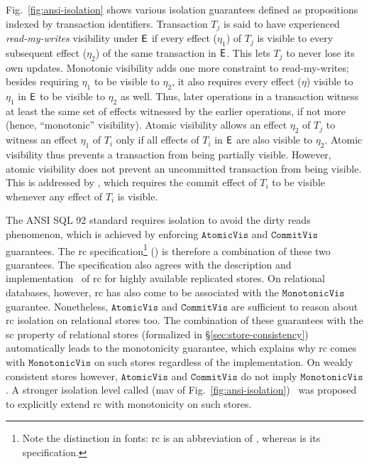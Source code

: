 Fig.~\ref{fig:ansi-isolation} shows various isolation guarantees
defined as propositions indexed by transaction identifiers.
Transaction $T_j$ is said to have experienced \emph{read-my-writes}
visibility under $\textsf{E}$ if every effect ($\eta_1$) of $T_j$ is visible
to every subsequent effect ($\eta_2$) of the same transaction in $\textsf{E}$.
This lets $T_j$ to never lose its own updates. Monotonic visibility
adds one more constraint to read-my-writes; besides requiring $\eta_1$
to be visible to $\eta_2$, it also requires every effect ($\eta$)
visible to $\eta_1$ in $\textsf{E}$ to be visible to $\eta_2$ as well. Thus,
later operations in a transaction witness at least the same set of
effects witnessed by the earlier operations, if not more (hence,
``monotonic'' visibility). Atomic visibility allows an effect
$\eta_2$ of $T_j$ to witness an effect $\eta_1$ of $T_i$ only if all
effects of $T_i$ in $\textsf{E}$ are also visible to $\eta_2$. Atomic
visibility thus prevents a transaction from being partially visible.
However, atomic visibility does not prevent an uncommitted transaction
from being visible. This is addressed by , which requires
the commit effect of $T_i$ to be visible whenever any effect of $T_i$
is visible.

The ANSI SQL 92 standard requires  isolation to
avoid the dirty reads phenomenon, which is achieved by enforcing
$\mathtt{AtomicVis}$ and $\mathtt{CommitVis}$ guarantees. The {\sc rc}
specification\footnote{Note the distinction in fonts: {\sc rc} is an
abbreviation of , whereas  is its
specification.} () is therefore a combination of these two
guarantees. The specification also agrees with the description and
implementation~\cite{bailishat,pldi15} of {\sc rc} for highly
available replicated stores. On relational databases, however, {\sc
rc} has also come to be associated with the $\mathtt{MonotonicVis}$
guarantee.  Nonetheless, $\mathtt{AtomicVis}$ and $\mathtt{CommitVis}$
are sufficient to reason about {\sc rc} isolation on relational stores
too. The combination of these guarantees with the {\sc sc} property of
relational stores (formalized in \S\ref{sec:store-consistency})
automatically leads to the monotonicity guarantee, which explains why
{\sc rc} comes with $\mathtt{MonotonicVis}$ on such stores regardless
of the implementation. On weakly consistent stores however,
$\mathtt{AtomicVis}$ and $\mathtt{CommitVis}$ do not imply
$\mathtt{MonotonicVis}$. A stronger isolation level called
 ({\sc mav} of
Fig.~\ref{fig:ansi-isolation})~\cite{bailishat} was proposed to
explicitly extend {\sc rc} with monotonicity on such stores. 

